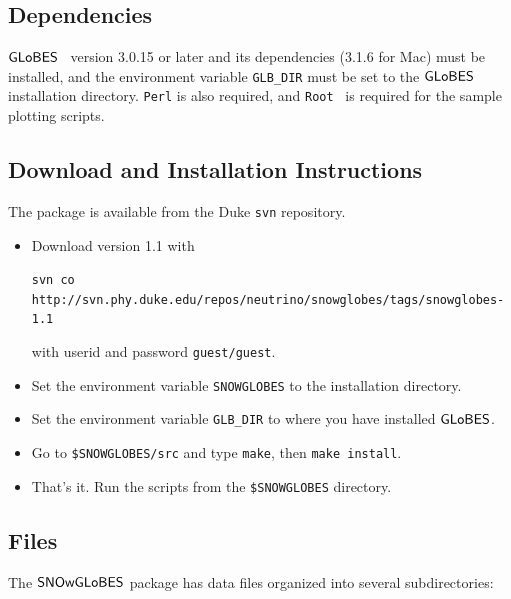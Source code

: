 \documentclass[12pt]{article}
\newcommand{\globes}{\sf{GLoBES}}
\newcommand{\snowglobes}{\sf{SNOwGLoBES}}
\begin{document}
\subsection{Dependencies}

$\globes$~\cite{globes} version 3.0.15 or later and its dependencies
(3.1.6 for Mac)  must be installed, and the
environment variable \texttt{GLB\_DIR} must be set to the $\globes$
installation directory.  \texttt{Perl} is also required, and \texttt{Root}~\cite{root} is required for the sample plotting scripts.

\subsection{Download and Installation Instructions}

The package is available from the Duke \texttt{svn} repository.

\begin{itemize}
\item Download version 1.1 with

\noindent
\texttt{svn co http://svn.phy.duke.edu/repos/neutrino/snowglobes/tags/snowglobes-1.1}

with userid and password \texttt{guest/guest}.

\item Set the environment variable \texttt{SNOWGLOBES} to the installation directory.  

\item Set the environment variable \texttt{GLB\_DIR} to where you have installed $\globes$.

\item Go to \texttt{\$SNOWGLOBES/src} and type \texttt{make}, then
\texttt{make install}.  

\item That's it.  Run the scripts from the \texttt{\$SNOWGLOBES} directory.

\end{itemize}

\subsection{Files}

The $\snowglobes$ package has data files organized into several subdirectories:
\end{document}
